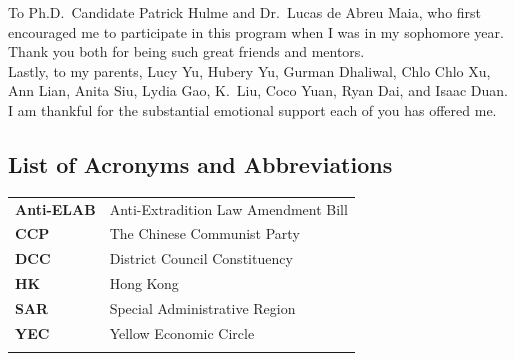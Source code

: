 \documentclass[letterpaper, 12pt]{article}
\begin{document}
\begin{titlepage}
To Ph.D.\ Candidate Patrick Hulme and Dr.\ Lucas de Abreu Maia, who first encouraged me to participate in this program when I was in my sophomore year. Thank you both for being such great friends and mentors.\\

Lastly, to my parents, Lucy Yu, Hubery Yu, Gurman Dhaliwal, Chlo Chlo Xu, Ann Lian, Anita Siu, Lydia Gao, K.\ Liu, Coco Yuan, Ryan Dai, and Isaac Duan. I am thankful for the substantial emotional support each of you has offered me.
\end{titlepage}







\setcounter{secnumdepth}{3}
\setcounter{tocdepth}{4}

\begin{titlepage}
\tableofcontents
\thispagestyle{empty}

\end{titlepage}



\begin{titlepage}
\listoffigures


\listoftables
\section*{List of Acronyms and Abbreviations}
\begin{table}[h!]
\centering\begingroup\fontsize{11}{12}\selectfont
\setlength\extrarowheight{2pt} 
\begin{tabularx}{\textwidth}{CC}
\textbf{Anti-ELAB} & Anti-Extradition Law Amendment Bill\\
\textbf{CCP} & The Chinese Communist Party\\
\textbf{DCC} & District Council Constituency\\
\textbf{HK} & Hong Kong\\
\textbf{SAR} & Special Administrative Region\\
\textbf{YEC} & Yellow Economic Circle\\

\thispagestyle{empty}



\end{tabularx}
\endgroup{}
\end{table}




\end{titlepage}
\end{document}
